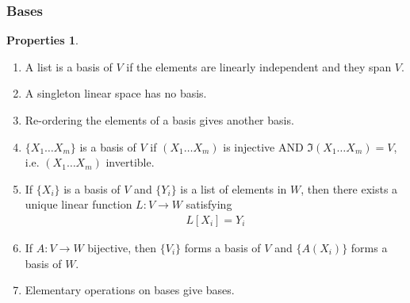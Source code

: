 \documentclass{article}
\theoremstyle{definition}
\newtheorem{prop}{Properties}[section]
\begin{document}
\subsubsection{Bases}
\begin{prop}
	$\,$
	\begin{enumerate}
		\item A list is a basis of $V$ if the elements are linearly independent and they span $V$.
		\item A singleton linear space has no basis.
		\item Re-ordering the elements of a basis gives another basis.
		\item $\{X_1\dots X_m\}$ is a basis of $V$ if $(X_1\dots X_m)$ is injective AND $\Im(X_1\dots X_m) = V$, i.e. $(X_1\dots X_m)$ invertible.
		\item If $\{X_i\}$ is a basis of $V$ and $\{Y_i \}$ is a list of elements in $W$, then there exists a unique linear function $L : V \rightarrow W$ satisfying 
		\begin{align*}
		L[X_i] = Y_i
		\end{align*} 
		\item If $A: V \rightarrow W$ bijective, then $\{ V_i \}$ forms a basis of $V$ and $\{A(X_i) \}$ forms a basis of $W$.
		\item Elementary operations on bases give bases.  
	\end{enumerate}
\end{prop}
\end{document}
